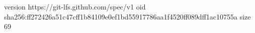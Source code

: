 version https://git-lfs.github.com/spec/v1
oid sha256:ff272426a51c47cff1b84109e0ef1bd55917786aa1f4520ff089dff1ac10755a
size 69
